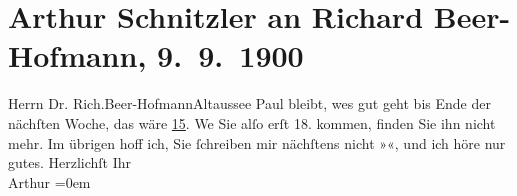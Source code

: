 

         
         \renewcommand{\erwaehntePersonen}{Personen: Richard Beer-Hofmann, Paul Goldmann}
         \renewcommand{\erwaehnteOrte}{Orte: Altaussee, I., Innere Stadt, Wien}
         \renewcommand{\erwaehnteWerke}{}
               \section[Arthur Schnitzler an Richard Beer-Hofmann, 9. 9. 1900]{ Arthur Schnitzler an Richard Beer-Hofmann, 9. 9. 1900}\nopagebreak{}\rehead{ }\begin{ledgroupsized}[t]{13cm}\normalsize\beginnumbering \toendnotes[C]{\smallbreak\pagebreak[2]} 
\toendnotes[C]{\smallbreak}\pstart{}{\pb}Herrn Dr. Rich.\pend{}\pstart{}Beer-Hofmann\pend{}\pstart{}Altaussee\pend{}{\bigskip}\pstart
           \noindent{}{\pb}Paul bleibt, we{\geminationn}s
               gut geht bis Ende der nächſten Woche, das wäre \uline{15}. We{\geminationn} Sie alſo erſt 18. kommen, finden
               Sie ihn nicht mehr. Im übrigen hoff ich, Sie ſchreiben mir nächſtens nicht »\label{K_L01072_1v}\label{K_L01072_1h}«, und ich höre nur gutes.\pend
           \pstart
           Herzlichſt Ihr{\\[\baselineskip]}\spacefill\mbox{Arthur}\pend
           \leftskip=0em{}
         
         \endnumbering{}\end{ledgroupsized}  \newcommand{\dateiname}{L01072}\newcommand{\titel}{Arthur Schnitzler an Richard Beer-Hofmann, 9. 9. 1900}\newcommand{\editorInnen}{Martin Anton Müller und Gerd-Hermann Susen}
      